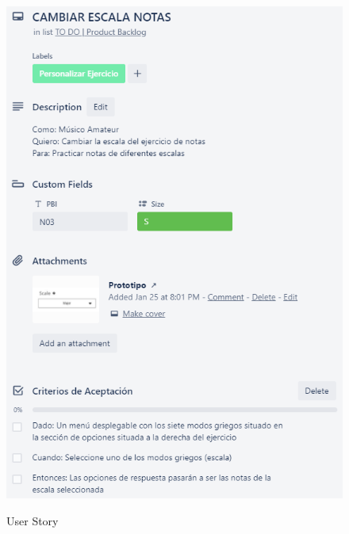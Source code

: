 \documentclass[12pt,twoside,titlepage]{report}
\begin{document}
{\begin{figure}[H]
    \centering
    \includegraphics[scale=1.3]{Scrum/User Stories/NotasSelectorEscalas}
    \label{fig:NotasSelectorEscalas}
    \caption{User Story}
\end{figure}

}
\end{document}
